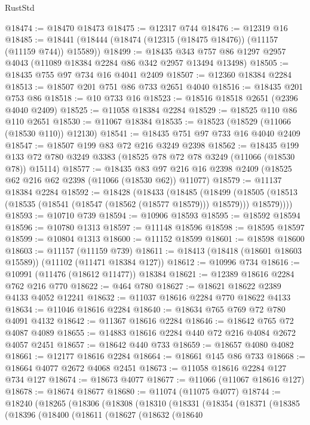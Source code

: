 \begin{lexlean}{RustStd}
\begin{coremodule}
@18474 := @18470 @18473
@18475 := @12317 @744
@18476 := @12319 @16
@18485 := @18441 (@18444 (@18474 (@12315 (@18475 @18476)) (@11157 (@11159 @744)) @15589))
@18499 := @18435 @343 @757 @86 @1297 @2957 @4043 (@11089 @18384 @2284 @86 @342 @2957 @13494 @13498)
@18505 := @18435 @755 @97 @734 @16 @4041 @2409
@18507 := @12360 @18384 @2284
@18513 := @18507 @201 @751 @86 @733 @2651 @4040
@18516 := @18435 @201 @753 @86
@18518 := @10 @733 @16
@18523 := @18516 @18518 @2651 (@2396 @4040 @2409)
@18525 := @11058 @18384 @2284
@18529 := @18525 @110 @86 @110 @2651
@18530 := @11067 @18384
@18535 := @18523 (@18529 (@11066 (@18530 @110)) @12130)
@18541 := @18435 @751 @97 @733 @16 @4040 @2409
@18547 := @18507 @199 @83 @72 @216 @3249 @2398
@18562 := @18435
    @199
    @133
    @72
    @780
    @3249
    @3383
    (@18525 @78 @72 @78 @3249 (@11066 (@18530 @78)) @15114)
@18577 := @18435
    @83
    @97
    @216
    @16
    @2398
    @2409
    (@18525 @62 @216 @62 @2398 (@11066 (@18530 @62)) @11077)
@18579 := @11137 @18384 @2284
@18592 := @18428
    (@18433
      (@18485
        (@18499
          (@18505 (@18513 (@18535 (@18541 (@18547 (@18562 (@18577 @18579))) @18579))) @18579))))
@18593 := @10710 @739
@18594 := @10906 @18593
@18595 := @18592 @18594
@18596 := @10780 @1313
@18597 := @11148 @18596
@18598 := @18595 @18597
@18599 := @10804 @1313
@18600 := @11152 @18599
@18601 := @18598 @18600
@18603 := @11157 (@11159 @739)
@18611 := @18413 (@18418 (@18601 @18603 @15589)) (@11102 (@11471 @18384 @127))
@18612 := @10996 @734
@18616 := @10991 (@11476 (@18612 @11477)) @18384
@18621 := @12389 @18616 @2284 @762 @216 @770
@18622 := @464 @780
@18627 := @18621 @18622 @2389 @4133 @4052 @12241
@18632 := @11037 @18616 @2284 @770 @18622 @4133
@18634 := @11046 @18616 @2284
@18640 := @18634 @765 @769 @72 @780 @4091 @4132
@18642 := @11367 @18616 @2284
@18646 := @18642 @765 @72 @4087 @4089
@18655 := @14883 @18616 @2284 @440 @72 @216 @4084 @2672 @4057 @2451
@18657 := @18642 @440 @733
@18659 := @18657 @4080 @4082
@18661 := @12177 @18616 @2284
@18664 := @18661 @145 @86 @733
@18668 := @18664 @4077 @2672 @4068 @2451
@18673 := @11058 @18616 @2284 @127 @734 @127
@18674 := @18673 @4077
@18677 := @11066 (@11067 @18616 @127)
@18678 := @18674 @18677
@18680 := @11074 (@11075 @4077)
@18744 := @18240
    (@18265
      (@18306
        (@18308
          (@18310
            (@18331
              (@18354
                (@18371
                  (@18385
                    (@18396
                      (@18400
                        (@18611
                          (@18627
                            (@18632
                              (@18640

\end{coremodule}
\end{lexlean}
